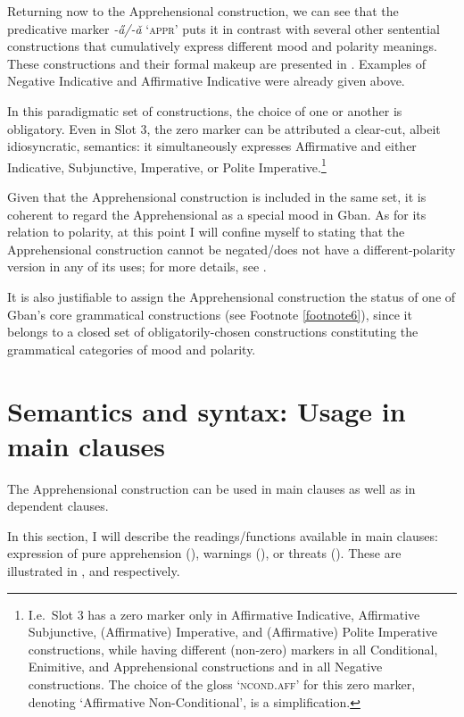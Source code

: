 \documentclass[output=paper,colorlinks,citecolor=brown
]{langscibook}
\begin{document}
 Returning now to the Apprehensional construction, we can see that the predicative marker \textit{-a̋/-ǎ} `\textsc{appr}' puts it in contrast with several other sentential constructions that cumulatively express different mood and polarity meanings. These constructions and their formal makeup are presented in . Examples of Negative Indicative  and Affirmative Indicative  were already given above.


In this paradigmatic set of constructions, the choice of one or another is obligatory. Even in Slot 3, the zero marker can be attributed a clear-cut, albeit idiosyncratic, semantics: it simultaneously expresses Affirmative and either Indicative, Subjunctive, Imperative, or Polite Imperative.\footnote{I.e.\ Slot 3 has a zero marker only in Affirmative Indicative, Affirmative Subjunctive, (Affirmative) Imperative, and (Affirmative) Polite Imperative constructions, while having different (non-zero) markers in all Conditional, Enimitive, and Apprehensional constructions and in all Negative constructions. The choice of the gloss `\textsc{ncond.aff}' for this zero marker, denoting `Affirmative Non-Conditional', is a simplification.\label{footnote9}}

Given that the Apprehensional construction is included in the same set, it is coherent to regard the Apprehensional as a special mood in Gban. As for its relation to polarity, at this point I will confine myself to stating that the Apprehensional construction cannot be negated\slash does not have a different-polarity version in any of its uses; for more details, see .

It is also justifiable to assign the Apprehensional construction the status of one of Gban's core grammatical constructions (see Footnote \ref{footnote6}), since it belongs to a closed set of obligatorily-chosen constructions constituting the grammatical categories of mood and polarity.



\section{Semantics and syntax: Usage in main clauses}
\label{sec:fedotov:synsemmain}

The Apprehensional construction can be used in main clauses as well as in dependent clauses.

In this section, I will describe the readings\slash functions available in main clauses: expression of pure apprehension (), warnings (), or threats (). These are illustrated in ,  and  respectively.
\end{document}
